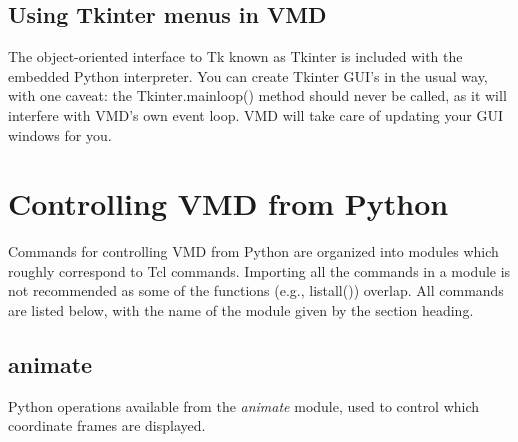 \subsection{Using Tkinter menus in VMD}
The object-oriented interface to Tk known as Tkinter is included with
the embedded Python interpreter.  You can create Tkinter GUI's in the
usual way, with one caveat: the Tkinter.mainloop() method should never
be called, as it will interfere with VMD's own event loop.  VMD will
take care of updating your GUI windows for you.

\section{Controlling VMD from Python}
Commands for controlling VMD from Python are organized into modules which
roughly correspond to Tcl commands.  Importing all the commands in a module
is not recommended as some of the functions (e.g., listall()) overlap.
All commands are listed below, with the name of the module given by the
section heading.

\subsection{animate}
Python operations available from the {\it animate} module, used to
control which coordinate frames are displayed.

